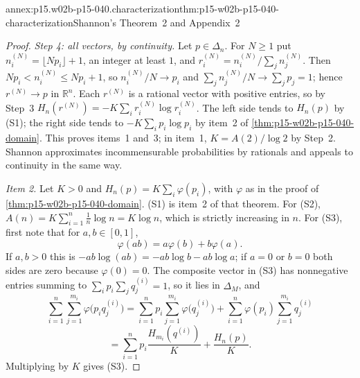\begin{annexitem}{annex:p15.w02b-p15-040.characterization}{thm:p15-w02b-p15-040-characterization}{Shannon's Theorem~2 and Appendix~2}
\begin{proof}
\emph{Step 4: all vectors, by continuity.} Let \(p\in\Delta_n\). For
\(N\geq1\) put \(n_i^{(N)}=\lfloor Np_i\rfloor+1\), an integer at least
\(1\), and \(r^{(N)}_i=n_i^{(N)}/\sum_jn_j^{(N)}\). Then
\(Np_i<n_i^{(N)}\leq Np_i+1\), so \(n_i^{(N)}/N\to p_i\) and
\(\sum_jn_j^{(N)}/N\to\sum_jp_j=1\); hence \(r^{(N)}\to p\) in
\(\mathbb R^n\). Each \(r^{(N)}\) is a rational vector with positive
entries, so by Step~3
\(H_n(r^{(N)})=-K\sum_ir^{(N)}_i\log r^{(N)}_i\). The left side
tends to \(H_n(p)\) by (S1); the right side tends to
\(-K\sum_ip_i\log p_i\) by item~2 of
\cref{thm:p15-w02b-p15-040-domain}. This proves items~1 and~3; in
item~1, \(K=A(2)/\log2\) by Step~2. Shannon approximates
incommensurable probabilities by rationals and appeals to continuity in
the same way.

\emph{Item 2.} Let \(K>0\) and \(H_n(p)=K\sum_i\varphi(p_i)\), with
\(\varphi\) as in the proof of \cref{thm:p15-w02b-p15-040-domain}.
(S1) is item~2 of that theorem. For (S2),
\(A(n)=K\sum_{i=1}^n\tfrac1n\log n=K\log n\), which is strictly
increasing in \(n\). For (S3), first note that for \(a,b\in[0,1]\),
\[
 \varphi(ab)=a\varphi(b)+b\varphi(a).
\]
If \(a,b>0\) this is \(-ab\log(ab)=-ab\log b-ab\log a\); if \(a=0\) or
\(b=0\) both sides are zero because \(\varphi(0)=0\). The composite
vector in (S3) has nonnegative entries summing to
\(\sum_ip_i\sum_jq^{(i)}_j=1\), so it lies in \(\Delta_M\), and
\[
 \sum_{i=1}^n\sum_{j=1}^{m_i}\varphi\bigl(p_iq^{(i)}_j\bigr)
 =\sum_{i=1}^np_i\sum_{j=1}^{m_i}\varphi\bigl(q^{(i)}_j\bigr)
  +\sum_{i=1}^n\varphi(p_i)\sum_{j=1}^{m_i}q^{(i)}_j
\]
\[
 =\sum_{i=1}^np_i\frac{H_{m_i}(q^{(i)})}K+\frac{H_n(p)}K .
\]
Multiplying by \(K\) gives (S3).
\end{proof}
\end{annexitem}

